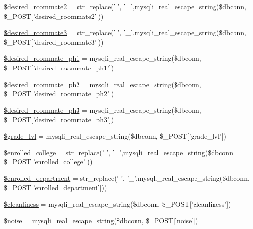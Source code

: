 \begin{DoxyCompactItemize}
\hyperlink{user__view_2validate_2studentVal_8php_aeaab2ccbd0e9359193a66a1c07606bf8}{\$desired\-\_\-roommate2} = str\-\_\-replace(' ', '\-\_\-',mysqli\-\_\-real\-\_\-escape\-\_\-string(\$dbconn, \$\-\_\-\-P\-O\-S\-T\mbox{[}'desired\-\_\-roommate2'\mbox{]}))
\item 
\hyperlink{user__view_2validate_2studentVal_8php_a6c6068b6183d30d97211b0acc4c44e97}{\$desired\-\_\-roommate3} = str\-\_\-replace(' ', '\-\_\-',mysqli\-\_\-real\-\_\-escape\-\_\-string(\$dbconn, \$\-\_\-\-P\-O\-S\-T\mbox{[}'desired\-\_\-roommate3'\mbox{]}))
\item 
\hyperlink{user__view_2validate_2studentVal_8php_a16c9576f781eff1e7ea69dfb51ee308c}{\$desired\-\_\-roommate\-\_\-ph1} = mysqli\-\_\-real\-\_\-escape\-\_\-string(\$dbconn, \$\-\_\-\-P\-O\-S\-T\mbox{[}'desired\-\_\-roommate\-\_\-ph1'\mbox{]})
\item 
\hyperlink{user__view_2validate_2studentVal_8php_ad955a7541f031fbdf7a0bc5546bdd541}{\$desired\-\_\-roommate\-\_\-ph2} = mysqli\-\_\-real\-\_\-escape\-\_\-string(\$dbconn, \$\-\_\-\-P\-O\-S\-T\mbox{[}'desired\-\_\-roommate\-\_\-ph2'\mbox{]})
\item 
\hyperlink{user__view_2validate_2studentVal_8php_aa8370cdba5dc6efab40e588b41321612}{\$desired\-\_\-roommate\-\_\-ph3} = mysqli\-\_\-real\-\_\-escape\-\_\-string(\$dbconn, \$\-\_\-\-P\-O\-S\-T\mbox{[}'desired\-\_\-roommate\-\_\-ph3'\mbox{]})
\item 
\hyperlink{user__view_2validate_2studentVal_8php_a379014f2a48154febd53d5f95871dc14}{\$grade\-\_\-lvl} = mysqli\-\_\-real\-\_\-escape\-\_\-string(\$dbconn, \$\-\_\-\-P\-O\-S\-T\mbox{[}'grade\-\_\-lvl'\mbox{]})
\item 
\hyperlink{user__view_2validate_2studentVal_8php_a4918f9ca4d470ccadff836850844ea58}{\$enrolled\-\_\-college} = str\-\_\-replace(' ', '\-\_\-',mysqli\-\_\-real\-\_\-escape\-\_\-string(\$dbconn, \$\-\_\-\-P\-O\-S\-T\mbox{[}'enrolled\-\_\-college'\mbox{]}))
\item 
\hyperlink{user__view_2validate_2studentVal_8php_a2c21a55b0bd902797539f840b7bf94dc}{\$enrolled\-\_\-department} = str\-\_\-replace(' ', '\-\_\-',mysqli\-\_\-real\-\_\-escape\-\_\-string(\$dbconn, \$\-\_\-\-P\-O\-S\-T\mbox{[}'enrolled\-\_\-department'\mbox{]}))
\item 
\hyperlink{user__view_2validate_2studentVal_8php_a7a259082f57125b6bd143f3387a5f655}{\$cleanliness} = mysqli\-\_\-real\-\_\-escape\-\_\-string(\$dbconn, \$\-\_\-\-P\-O\-S\-T\mbox{[}'cleanliness'\mbox{]})
\item 
\hyperlink{user__view_2validate_2studentVal_8php_a2774f17621ab4d3b64411f86c88df407}{\$noise} = mysqli\-\_\-real\-\_\-escape\-\_\-string(\$dbconn, \$\-\_\-\-P\-O\-S\-T\mbox{[}'noise'\mbox{]})

\end{DoxyCompactItemize}
